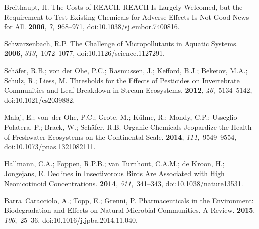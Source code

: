 \documentclass[data,datadescriptor,accept,moreauthors,pdftex]{Definitions/mdpi}
\begin{document}
\begin{thebibliography}{999}
\providecommand{\natexlab}[1]{#1}

Breithaupt, H.
\newblock The Costs of {{REACH}}. {{REACH}} Is Largely Welcomed, but the
  Requirement to Test Existing Chemicals for Adverse Effects Is Not Good News
  for All.
 {\bf 2006}, {\em 7},~968--971, doi:10.1038/sj.embor.7400816.

Schwarzenbach, R.P.
\newblock The {{Challenge}} of {{Micropollutants}} in {{Aquatic Systems}}.
 {\bf 2006}, {\em 313},~1072--1077, doi:10.1126/science.1127291.

Sch{\"a}fer, R.B.; {von der Ohe}, P.C.; Rasmussen, J.; Kefford, B.J.; Beketov,
  M.A.; Schulz, R.; Liess, M.
\newblock Thresholds for the {{Effects}} of {{Pesticides}} on {{Invertebrate
  Communities}} and {{Leaf Breakdown}} in {{Stream Ecosystems}}.
 {\bf 2012}, {\em
  46},~5134--5142, doi:10.1021/es2039882.

Malaj, E.; von~der Ohe, P.C.; Grote, M.; K{\"u}hne, R.; Mondy, C.P.;
  {Usseglio-Polatera}, P.; Brack, W.; Sch{\"a}fer, R.B.
\newblock Organic Chemicals Jeopardize the Health of Freshwater Ecosystems on
  the Continental Scale.
 {\bf 2014},
  {\em 111},~9549--9554, doi:10.1073/pnas.1321082111.

Hallmann, C.A.; Foppen, R.P.B.; {van Turnhout}, C.A.M.; {de Kroon}, H.;
  Jongejans, E.
\newblock Declines in Insectivorous Birds Are Associated with High
  Neonicotinoid Concentrations.
 {\bf 2014}, {\em 511},~341--343, doi:10.1038/nature13531.

Barra~Caracciolo, A.; Topp, E.; Grenni, P.
\newblock Pharmaceuticals in the Environment: {{Biodegradation}} and Effects on
  Natural Microbial Communities. {{A}} Review.
 {\bf 2015},
  {\em 106},~25--36, doi:10.1016/j.jpba.2014.11.040.


\end{thebibliography}
\end{document}
